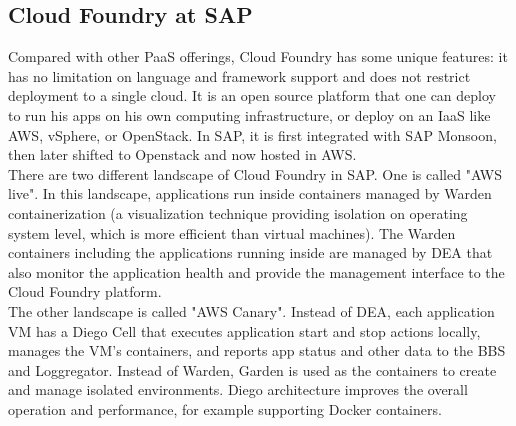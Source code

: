 \subsection{Cloud Foundry at SAP}
Compared with other PaaS offerings, Cloud Foundry has some unique features: it has no limitation on language and framework support and does not restrict deployment to a single cloud.  It is an open source platform that one can deploy to run his apps on his own computing infrastructure, or deploy on an IaaS like \ac{AWS}, vSphere, or OpenStack. In SAP, it is first integrated with SAP Monsoon, then later shifted to Openstack and now hosted in \ac{AWS}. \\
There are two different landscape of Cloud Foundry in SAP. One is called "AWS live". In this landscape, applications run inside containers managed by Warden   \citep{Warden} containerization (a visualization technique providing isolation on operating system level, which is more efficient than virtual machines). The Warden containers including the applications running inside are managed by \ac{DEA} that also monitor the application health and provide the management interface to the Cloud Foundry platform.\\
The other landscape is called "AWS Canary". Instead of \ac{DEA}, each application VM has a Diego Cell   \citep{Diego} that executes application start and stop actions locally, manages the VM’s containers, and reports app status and other data to the \ac{BBS} \citep{BBS} and Loggregator. Instead of Warden, Garden \citep{Garden} is used as the containers to create and manage isolated environments. Diego architecture improves the overall operation and performance, for example supporting Docker containers.

